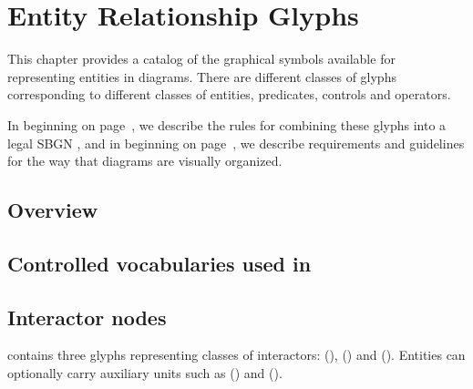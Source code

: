 
\chapter{Entity Relationship Glyphs}

This chapter provides a catalog of the graphical symbols available for representing entities in \ER diagrams.  There are different classes of glyphs corresponding to different classes of entities, predicates, controls and operators.

In  beginning on page~\pageref{chp:grammar}, we describe the rules for combining these glyphs into a legal SBGN \ER, and in  beginning on page~\pageref{chp:layout}, we describe requirements and guidelines for the way that diagrams are visually organized.

\section{Overview}
 

 
\section{Controlled vocabularies used in \SBGNERLone}\label{sec:CVs}


 
 
 \section{Interactor nodes}\label{sec:interactors}

\SBGNERLone{} contains three glyphs representing classes of interactors:  (),  () and  (). Entities can optionally carry auxiliary units such as  () and  ().

